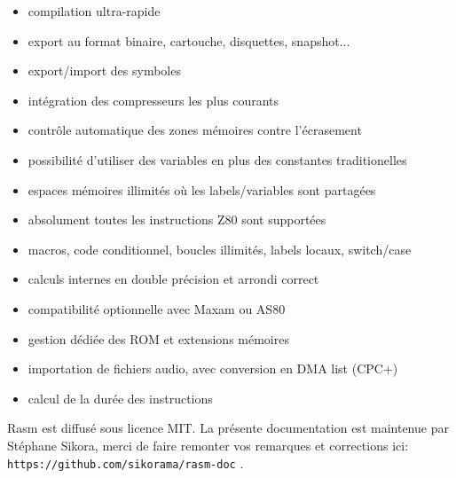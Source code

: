 \begin{xfr}
\begin{itemize}[noitemsep]
\item compilation ultra-rapide
\item export au format binaire, cartouche, disquettes, snapshot...
\item export/import des symboles
\item intégration des compresseurs les plus courants
\item contrôle automatique des zones mémoires contre l'écrasement
\item possibilité d'utiliser des variables en plus des constantes traditionelles
\item espaces mémoires illimités où les labels/variables sont partagées
\item absolument toutes les instructions Z80 sont supportées
\item macros, code conditionnel, boucles illimités, labels locaux, switch/case
\item calculs internes en double précision et arrondi correct
\item compatibilité optionnelle avec Maxam ou AS80
\item gestion dédiée des ROM et extensions mémoires
\item importation de fichiers audio, avec conversion en DMA list (CPC+)
\item calcul de la durée des instructions
\end{itemize}
\medbreak
Rasm est diffusé sous licence MIT.
\medbreak
La présente documentation est maintenue par Stéphane Sikora, merci de faire remonter vos remarques et corrections ici: \texttt{https://github.com/sikorama/rasm-doc} .
\end{xfr}

